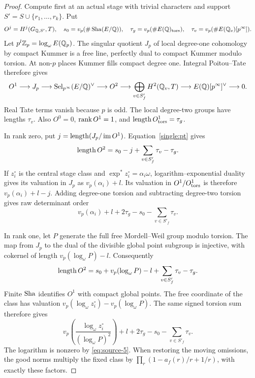 \begin{proof}
Compute first at an actual stage with trivial characters and
support \(S'=S\cup\{r_1,\ldots,r_k\}\).  Put
\[
 O^j=H^j(G_{\mathbb Q,S'},T),\quad
 s_0=v_p(\#\operatorname{Sha}(E/\mathbb Q)),\quad
 \tau_g=v_p(\#E(\mathbb Q)_{\rm tors}),\quad
 \tau_v=v_p(\#E(\mathbb Q_v)[p^\infty]).
\]
Let \(p^l\mathbb Z_p=\log_\omega E(\mathbb Q_p)\).  The singular quotient
\(J_p\) of local degree-one cohomology by compact Kummer is a
free line, perfectly dual to compact Kummer modulo torsion.
At non-\(p\) places Kummer fills compact degree one.  Integral
Poitou--Tate therefore gives
\begin{equation}\label{single:pt}
 \begin{split}
 O^1\longrightarrow J_p\longrightarrow\operatorname{Sel}_{p^\infty}(E/\mathbb Q)^\vee
 \longrightarrow O^2\longrightarrow
 \bigoplus_{v\in S'_f}H^2(\mathbb Q_v,T)
 \longrightarrow E(\mathbb Q)[p^\infty]^\vee\longrightarrow0.
 \end{split}
\end{equation}
Real Tate terms vanish because \(p\) is odd.  The local
degree-two groups have lengths \(\tau_v\).  Also \(O^0=0\),
\(\operatorname{rank} O^1=1\), and \(\operatorname{length} O^1_{\rm tors}=\tau_g\).

In rank zero, put
\(j=\operatorname{length}(J_p/\operatorname{im} O^1)\).  Equation~\eqref{single:pt} gives
\[
              \operatorname{length} O^2=s_0-j+\sum_{v\in S'_f}\tau_v-\tau_g.
\]
If \(z_i^\circ\) is the central stage class and
\(\exp^*z_i^\circ=\alpha_i\omega\), logarithm--exponential
duality gives its valuation in \(J_p\) as \(v_p(\alpha_i)+l\).
Its valuation in \(O^1/O^1_{\rm tors}\) is therefore
\(v_p(\alpha_i)+l-j\).  Adding degree-one torsion and
subtracting degree-two torsion gives raw determinant order
\begin{equation}\label{single:raw-zero}
          v_p(\alpha_i)+l+2\tau_g-s_0-\sum_{v\in S'_f}\tau_v.
\end{equation}

In rank one, let \(P\) generate the full free Mordell--Weil
group modulo torsion.  The map from \(J_p\) to the dual of
the divisible global point subgroup is injective, with
cokernel of length \(v_p(\log_\omega P)-l\).  Consequently
\[
 \operatorname{length} O^2=s_0+v_p(\log_\omega P)-l
                                  +\sum_{v\in S'_f}\tau_v-\tau_g.
\]
Finite \(\operatorname{Sha}\) identifies \(O^1\) with compact global points.
The free coordinate of the class has valuation
\(v_p(\log_\omega z_i^\circ)-v_p(\log_\omega P)\).
The same signed torsion sum therefore gives
\begin{equation}\label{single:raw-one}
 v_p\left(\frac{\log_\omega z_i^\circ}
                        {(\log_\omega P)^2}\right)
                   +l+2\tau_g-s_0-\sum_{v\in S'_f}\tau_v.
\end{equation}
The logarithm is nonzero by \eqref{eq:source-5}.  When restoring
the moving omissions, the good norms multiply the fixed class
by \(\prod_r(1-a_f(r)/r+1/r)\), with exactly these factors.


\end{proof}
